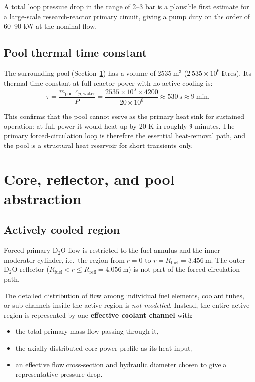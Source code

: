 \documentclass[11pt]{article}
\begin{document}
A total loop pressure drop in the range of 2--3 bar is a plausible first
estimate for a large-scale research-reactor primary circuit, giving a pump
duty on the order of 60--90 kW at the nominal flow.

\subsection{Pool thermal time constant}

The surrounding pool (Section~\ref{sec:pool}) has a volume of
$2535\ \mathrm{m^3}$ ($2.535 \times 10^6\ \mathrm{litres}$).  Its
thermal time constant at full reactor power with no active cooling is:
\[
\tau = \frac{m_{\mathrm{pool}}\,c_{p,\mathrm{water}}}{P}
= \frac{2535 \times 10^3 \times 4200}{20 \times 10^6}
\approx 530\ \mathrm{s}
\approx 9\ \mathrm{min}.
\]

This confirms that the pool cannot serve as the primary heat sink for
sustained operation: at full power it would heat up by 20 K in roughly
9 minutes.  The primary forced-circulation loop is therefore the
essential heat-removal path, and the pool is a structural heat reservoir
for short transients only.

\section{Core, reflector, and pool abstraction}
\label{sec:pool}

\subsection{Actively cooled region}

Forced primary D$_2$O flow is restricted to the fuel annulus and the
inner moderator cylinder, i.e.\ the region from $r = 0$ to
$r = R_{\mathrm{fuel}} = 3.456\ \mathrm{m}$.  The outer D$_2$O reflector
($R_{\mathrm{fuel}} < r \leq R_{\mathrm{refl}} = 4.056\ \mathrm{m}$) is
not part of the forced-circulation path.

The detailed distribution of flow among individual fuel elements, coolant
tubes, or sub-channels inside the active region is \emph{not modelled}.
Instead, the entire active region is represented by one
\textbf{effective coolant channel} with:
\begin{itemize}
  \item the total primary mass flow passing through it,
  \item the axially distributed core power profile as its heat input,
  \item an effective flow cross-section and hydraulic diameter chosen to
        give a representative pressure drop.
\end{itemize}
\end{document}
